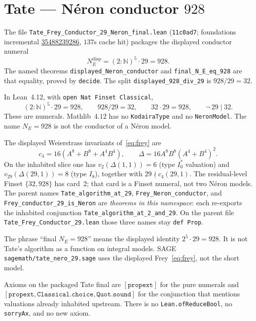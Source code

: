 \section{Tate --- N\'eron conductor $928$}\label{sec:tate}

The file
\texttt{Tate\_Frey\_Conductor\_29\_Neron\_final.lean}
(\texttt{11c0ad7}; foundations incremental
\href{https://github.com/DavidFox998/beal-level-26-foundations/actions/runs/35488239286}{35488239286},
$137$s cache hit) packages the displayed conductor numeral
\[
  N_E^{\mathrm{disp}}=(2:\mathbb{N})^5\cdot 29=928.
\]
The named theorems \texttt{displayed\_Neron\_conductor} and
\texttt{final\_N\_E\_eq\_928} are that equality, proved by
\texttt{decide}. The split \texttt{displayed\_928\_div\_29} is
$928/29=32$.

\begin{displaythm}
\label{disp:tate-928}
In Lean~4.12, with \texttt{open Nat Finset Classical},
\[
  (2:\mathbb{N})^5\cdot 29=928,\qquad
  928/29=32,\qquad
  32\cdot 29=928,\qquad
  \neg\,29\mid 32.
\]
These are numerals. Mathlib~$4.12$ has no \texttt{KodairaType} and
no \texttt{NeronModel}. The name $N_E=928$ is not the conductor of
a N\'eron model.
\end{displaythm}

The displayed Weierstrass invariants of~\eqref{eq:frey} are
\[
  c_4=16(A^8+B^8+A^4B^4),\qquad
  \Delta=16A^8B^8(A^4+B^4)^2.
\]
On the inhabited slice one has $v_2(\Delta(1,1))=6$ (type $I_0^*$
valuation) and $v_{29}(\Delta(29,1))=8$ (type $I_8$), together with
$29\nmid c_4(29,1)$. The residual-level Finset $\{32,928\}$ has
card~$2$; that card is a Finset numeral, not two N\'eron models.
The parent names \texttt{Tate\_algorithm\_at\_29},
\texttt{Frey\_Neron\_conductor}, and
\texttt{Frey\_conductor\_29\_is\_Neron} are \emph{theorems in this
namespace}: each re-exports the inhabited conjunction
\texttt{Tate\_algorithm\_at\_2\_and\_29}. On the parent file
\texttt{Tate\_Frey\_Conductor\_29.lean} those three names stay
\texttt{def Prop}.

\begin{honesty}
The phrase ``final $N_E=928$'' means the displayed identity
$2^5\cdot 29=928$. It is not Tate's algorithm as a function on
integral models. SAGE \texttt{sagemath/tate\_nero\_29.sage} uses
the displayed Frey~\eqref{eq:frey}, not the short model.
\end{honesty}

Axioms on the packaged Tate final are $[\mathtt{propext}]$ for the
pure numerals and $[\mathtt{propext},\mathtt{Classical.choice},\mathtt{Quot.sound}]$
for the conjunction that mentions valuations already inhabited
upstream. There is no \texttt{Lean.ofReduceBool}, no
\texttt{sorryAx}, and no new axiom.

